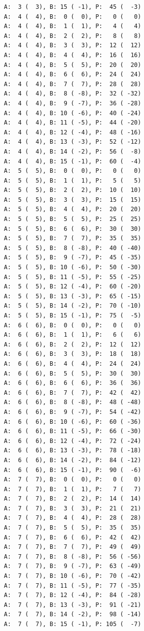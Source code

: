 \documentclass[12pt, titlepage]{report}
\begin{document}
\begin{framed}
\begin{verbatim}
A:  3 (  3), B: 15 ( -1), P:  45 (  -3)
A:  4 (  4), B:  0 (  0), P:   0 (   0)
A:  4 (  4), B:  1 (  1), P:   4 (   4)
A:  4 (  4), B:  2 (  2), P:   8 (   8)
A:  4 (  4), B:  3 (  3), P:  12 (  12)
A:  4 (  4), B:  4 (  4), P:  16 (  16)
A:  4 (  4), B:  5 (  5), P:  20 (  20)
A:  4 (  4), B:  6 (  6), P:  24 (  24)
A:  4 (  4), B:  7 (  7), P:  28 (  28)
A:  4 (  4), B:  8 ( -8), P:  32 ( -32)
A:  4 (  4), B:  9 ( -7), P:  36 ( -28)
A:  4 (  4), B: 10 ( -6), P:  40 ( -24)
A:  4 (  4), B: 11 ( -5), P:  44 ( -20)
A:  4 (  4), B: 12 ( -4), P:  48 ( -16)
A:  4 (  4), B: 13 ( -3), P:  52 ( -12)
A:  4 (  4), B: 14 ( -2), P:  56 (  -8)
A:  4 (  4), B: 15 ( -1), P:  60 (  -4)
A:  5 (  5), B:  0 (  0), P:   0 (   0)
A:  5 (  5), B:  1 (  1), P:   5 (   5)
A:  5 (  5), B:  2 (  2), P:  10 (  10)
A:  5 (  5), B:  3 (  3), P:  15 (  15)
A:  5 (  5), B:  4 (  4), P:  20 (  20)
A:  5 (  5), B:  5 (  5), P:  25 (  25)
A:  5 (  5), B:  6 (  6), P:  30 (  30)
A:  5 (  5), B:  7 (  7), P:  35 (  35)
A:  5 (  5), B:  8 ( -8), P:  40 ( -40)
A:  5 (  5), B:  9 ( -7), P:  45 ( -35)
A:  5 (  5), B: 10 ( -6), P:  50 ( -30)
A:  5 (  5), B: 11 ( -5), P:  55 ( -25)
A:  5 (  5), B: 12 ( -4), P:  60 ( -20)
A:  5 (  5), B: 13 ( -3), P:  65 ( -15)
A:  5 (  5), B: 14 ( -2), P:  70 ( -10)
A:  5 (  5), B: 15 ( -1), P:  75 (  -5)
A:  6 (  6), B:  0 (  0), P:   0 (   0)
A:  6 (  6), B:  1 (  1), P:   6 (   6)
A:  6 (  6), B:  2 (  2), P:  12 (  12)
A:  6 (  6), B:  3 (  3), P:  18 (  18)
A:  6 (  6), B:  4 (  4), P:  24 (  24)
A:  6 (  6), B:  5 (  5), P:  30 (  30)
A:  6 (  6), B:  6 (  6), P:  36 (  36)
A:  6 (  6), B:  7 (  7), P:  42 (  42)
A:  6 (  6), B:  8 ( -8), P:  48 ( -48)
A:  6 (  6), B:  9 ( -7), P:  54 ( -42)
A:  6 (  6), B: 10 ( -6), P:  60 ( -36)
A:  6 (  6), B: 11 ( -5), P:  66 ( -30)
A:  6 (  6), B: 12 ( -4), P:  72 ( -24)
A:  6 (  6), B: 13 ( -3), P:  78 ( -18)
A:  6 (  6), B: 14 ( -2), P:  84 ( -12)
A:  6 (  6), B: 15 ( -1), P:  90 (  -6)
A:  7 (  7), B:  0 (  0), P:   0 (   0)
A:  7 (  7), B:  1 (  1), P:   7 (   7)
A:  7 (  7), B:  2 (  2), P:  14 (  14)
A:  7 (  7), B:  3 (  3), P:  21 (  21)
A:  7 (  7), B:  4 (  4), P:  28 (  28)
A:  7 (  7), B:  5 (  5), P:  35 (  35)
A:  7 (  7), B:  6 (  6), P:  42 (  42)
A:  7 (  7), B:  7 (  7), P:  49 (  49)
A:  7 (  7), B:  8 ( -8), P:  56 ( -56)
A:  7 (  7), B:  9 ( -7), P:  63 ( -49)
A:  7 (  7), B: 10 ( -6), P:  70 ( -42)
A:  7 (  7), B: 11 ( -5), P:  77 ( -35)
A:  7 (  7), B: 12 ( -4), P:  84 ( -28)
A:  7 (  7), B: 13 ( -3), P:  91 ( -21)
A:  7 (  7), B: 14 ( -2), P:  98 ( -14)
A:  7 (  7), B: 15 ( -1), P: 105 (  -7)

\end{verbatim}
\end{framed}
\end{document}
